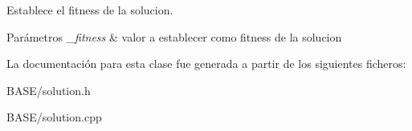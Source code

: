 Establece el fitness de la solucion. 


\begin{DoxyParams}{Parámetros}
{\em \+\_\+fitness} & valor a establecer como fitness de la solucion \\
\hline
\end{DoxyParams}


La documentación para esta clase fue generada a partir de los siguientes ficheros\+:\begin{DoxyCompactItemize}
\item 
B\+A\+S\+E/solution.\+h\item 
B\+A\+S\+E/solution.\+cpp\end{DoxyCompactItemize}
